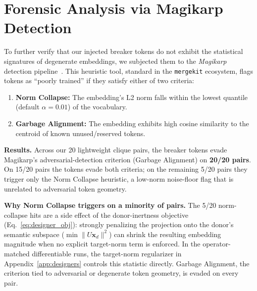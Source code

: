 \section{Forensic Analysis via Magikarp Detection}
\label{app:magikarp}

To further verify that our injected breaker tokens do not exhibit the statistical signatures of degenerate embeddings, we subjected them to the \textit{Magikarp} detection pipeline~\citep{land2024fishingmagikarpautomaticallydetecting}. This heuristic tool, standard in the \texttt{mergekit} ecosystem, flags tokens as ``poorly trained'' if they satisfy either of two criteria:
\begin{enumerate}
    \item \textbf{Norm Collapse:} The embedding's L2 norm falls within the lowest quantile (default $\alpha=0.01$) of the vocabulary.
    \item \textbf{Garbage Alignment:} The embedding exhibits high cosine similarity to the centroid of known unused/reserved tokens.
\end{enumerate}

\noindent\textbf{Results.}
Across our 20 lightweight clique pairs, the breaker tokens evade Magikarp's adversarial-detection criterion (Garbage Alignment) on \textbf{20/20 pairs}. On 15/20 pairs the tokens evade both criteria; on the remaining 5/20 pairs they trigger only the Norm Collapse heuristic, a low-norm noise-floor flag that is unrelated to adversarial token geometry.

\noindent\textbf{Why Norm Collapse triggers on a minority of pairs.}
The 5/20 norm-collapse hits are a side effect of the donor-inertness objective (Eq.~\ref{eq:designer_obj}): strongly penalizing the projection onto the donor's semantic subspace ($\min \|U \mathbf{x}_d\|^2$) can shrink the resulting embedding magnitude when no explicit target-norm term is enforced. In the operator-matched differentiable runs, the target-norm regularizer in Appendix~\ref{app:designers} controls this statistic directly. Garbage Alignment, the criterion tied to adversarial or degenerate token geometry, is evaded on every pair.

